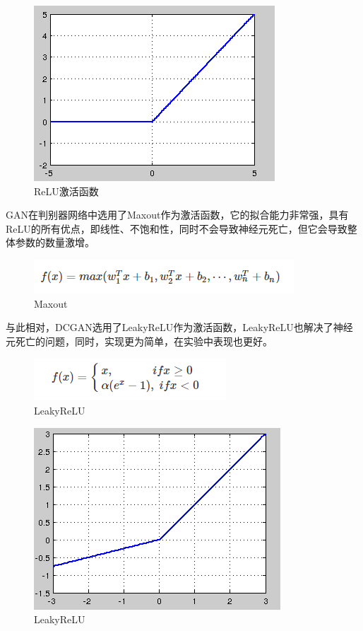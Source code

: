 \documentclass[
  hyperref, a4paper]{ctexart}
\begin{document}
\begin{figure}
\centering
\includegraphics{./15.jpg}
\caption{ReLU激活函数}
\end{figure}

GAN在判别器网络中选用了Maxout作为激活函数，它的拟合能力非常强，具有ReLU的所有优点，即线性、不饱和性，同时不会导致神经元死亡，但它会导致整体参数的数量激增。

\begin{figure}
\centering
\includegraphics{./16.png}
\caption{Maxout}
\end{figure}

与此相对，DCGAN选用了LeakyReLU作为激活函数，LeakyReLU也解决了神经元死亡的问题，同时，实现更为简单，在实验中表现也更好。

\begin{figure}
\centering
\includegraphics{./17.png}
\caption{LeakyReLU}
\end{figure}

\begin{figure}
\centering
\includegraphics{./18.jpg}
\caption{LeakyReLU}
\end{figure}
\end{document}
